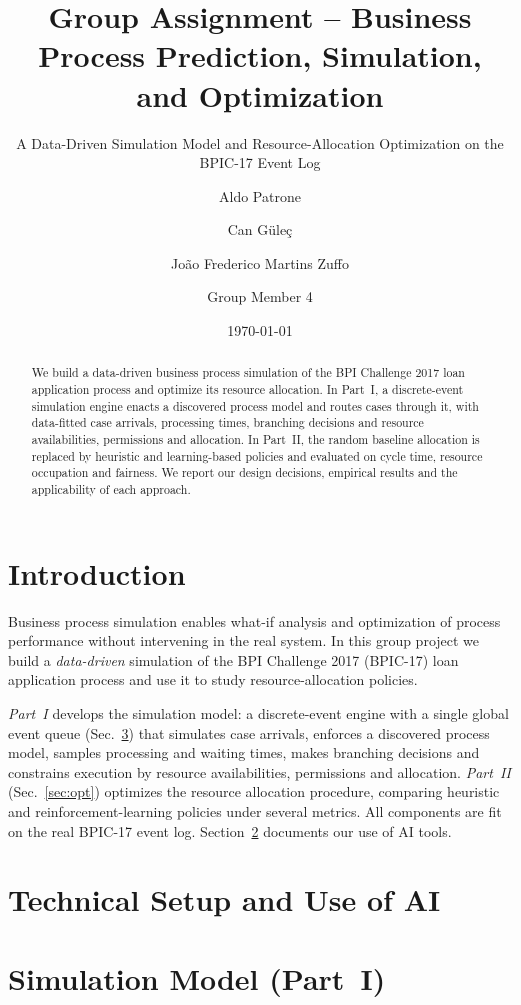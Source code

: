 \documentclass[
  english,
  font=times,
  twocolumn,
]{tumarticle}
\title{Group Assignment -- Business Process Prediction, Simulation, and Optimization}
\subtitle{A Data-Driven Simulation Model and Resource-Allocation Optimization on the BPIC-17 Event Log}
\author[email=aldo.patrone@tum.de]{Aldo Patrone}
\author[email=go34bef@tum.de]{Can Güleç}
\author[email=go69cip@tum.de]{João Frederico Martins Zuffo}
\author[email=member4@tum.de]{Group Member 4}
\date\today
\begin{document}
\maketitle

\begin{abstract}
We build a data-driven business process simulation of the BPI Challenge 2017 loan
application process and optimize its resource allocation. In Part~I, a discrete-event
simulation engine enacts a discovered process model and routes cases through it,
with data-fitted case arrivals, processing times, branching decisions and resource
availabilities, permissions and allocation. In Part~II, the random baseline
allocation is replaced by heuristic and learning-based policies and evaluated on
cycle time, resource occupation and fairness. We report our design decisions,
empirical results and the applicability of each approach.
\end{abstract}

\section{Introduction}
Business process simulation enables what-if analysis and optimization of process
performance without intervening in the real system. In this group project we build
a \emph{data-driven} simulation of the BPI Challenge 2017 (BPIC-17) loan application
process and use it to study resource-allocation policies.

\emph{Part~I} develops the simulation model: a discrete-event engine with a single
global event queue (Sec.~\ref{sec:sim}) that simulates case arrivals, enforces a
discovered process model, samples processing and waiting times, makes branching
decisions and constrains execution by resource availabilities, permissions and
allocation. \emph{Part~II} (Sec.~\ref{sec:opt}) optimizes the resource allocation
procedure, comparing heuristic and reinforcement-learning policies under several
metrics. All components are fit on the real BPIC-17 event log. Section~\ref{sec:ai}
documents our use of AI tools.

\section{Technical Setup and Use of AI}\label{sec:ai}


\section{Simulation Model (Part~I)}\label{sec:sim}
\end{document}
